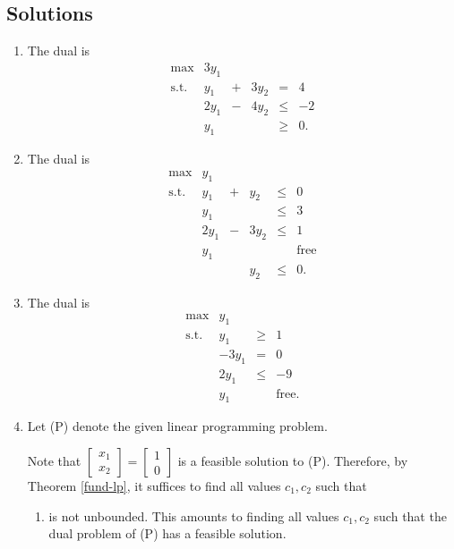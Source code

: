 \subsection*{Solutions}\label{solutions-6}

\begin{enumerate}
\def\labelenumi{\arabic{enumi}.}
\item
  The dual is \[\begin{array}{rrcrcll}
  \max & 3y_1 \\
  \text{s.t.} 
  & y_1 & +  & 3y_2 & = & 4\\
  & 2y_1 & - & 4y_2 & \leq & -2 \\
  &  y_1 &   &      &\geq & 0.
  \end{array}\]
\item
  The dual is \[\begin{array}{rrcrcll}
  \max  & y_1  &   &   \\
  \mbox{s.t.}
   & y_1 & + &  y_2 & \leq & 0 \\
   & y_1 &   &      & \leq & 3 \\
   &2y_1 & - & 3y_2 & \leq & 1 \\
   & y_1 &   &      &      & \mbox{free} \\
   &     &   &  y_2 &  \leq & 0.
  \end{array}\]
\item
  The dual is \[\begin{array}{rrcll}
  \max  & y_1  \\
  \mbox{s.t.}
   &   y_1 & \geq & 1 \\
   & -3y_1 & = & 0 \\
   & 2y_1 & \leq & -9 \\
   & y_1 &    & \mbox{free}.
  \end{array}\]
\item
  Let (P) denote the given linear programming problem.

  Note that
  \(\begin{bmatrix} x_1 \\ x_2\end{bmatrix} = \begin{bmatrix} 1 \\ 0\end{bmatrix}\)
  is a feasible solution to (P). Therefore, by Theorem \ref{fund-lp}, it
  suffices to find all values \(c_1,c_2\) such that

  \begin{enumerate}
  \def\labelenumii{(\Alph{enumii})}
  \setcounter{enumii}{15}
  \tightlist
  \item
    is not unbounded. This amounts to finding all values \(c_1,c_2\)
    such that the dual problem of (P) has a feasible solution.
  \end{enumerate}


\end{enumerate}

